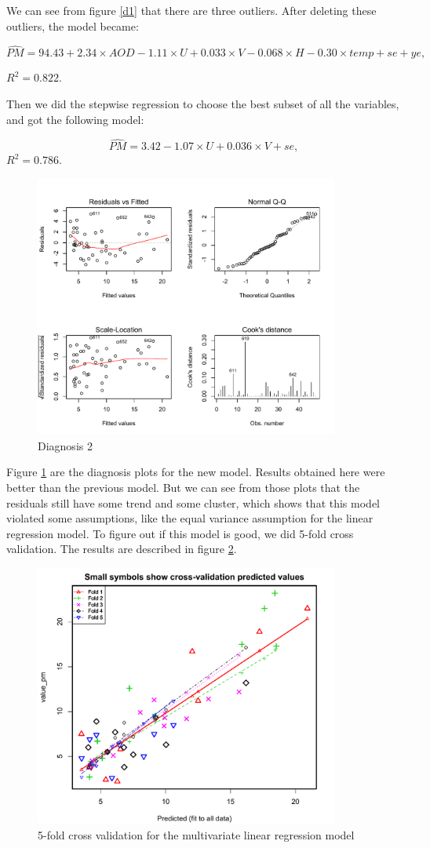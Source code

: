 \documentclass[10pt]{article}
\begin{document}
We can see from figure \ref{d1} that there are three outliers. After deleting these outliers, the model became:

$$\hat{PM} = 94.43 + 2.34\times AOD - 1.11\times U + 0.033\times V - 0.068\times H - 0.30\times temp + se + ye, $$

$R^2 = 0.822$.

Then we did the stepwise regression to choose the best subset of all the variables, and got the following model:

$$\hat{PM} = 3.42 -1.07\times U + 0.036\times V+ se, $$
$R^2 = 0.786$.

\begin{figure}[H]
\centering
\includegraphics[width = 100mm ]{residual2.pdf}
\caption{Diagnosis 2}
\label{d2}
\end{figure}

Figure \ref{d2} are the diagnosis plots for the new model. Results obtained here were better than the previous model. But we can see from those plots that the residuals still have some trend and some cluster, which shows that this model violated some assumptions, like the equal variance assumption for the linear regression model. To figure out if this model is good, we did 5-fold cross validation. The results are described in figure \ref{cv}. 

\begin{figure}[H]
\centering
\includegraphics[width = 100mm]{cv_lm.pdf}
\caption{5-fold cross validation for the multivariate linear regression model}
\label{cv}
\end{figure}
\end{document}
